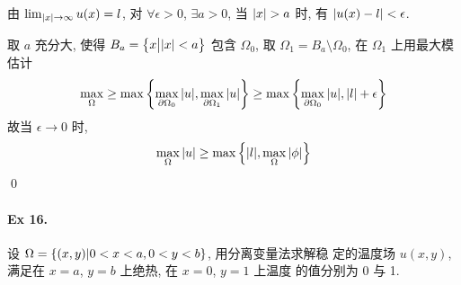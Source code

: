 \begin{solution}
由 $\lim_{{\lvert {x} \rvert} \to \infty} u(x) = l$, 对 $\forall\epsilon>0$, $\exists a>0$,
当 ${\lvert {x} \rvert}>a$ 时, 有 ${\lvert {u(x)-l} \rvert}<\epsilon$.

取 $a$ 充分大, 使得 $B_a = \big\{x \big| {\lvert {x} \rvert} < a\big\}$ 包含 $\Omega_0$, 取
$\Omega_1 = B_a \setminus \Omega_0$, 在 $\Omega_1$ 上用最大模估计
\[
\max_{\Omega} \geq \max{\left\{ {
    \max_{\partial\Omega_0}{\lvert {u} \rvert}, \max_{\partial\Omega_1}{\lvert {u} \rvert}
} \right\}} \geq \max{\left\{ {
    \max_{\partial\Omega_0}{\lvert {u} \rvert}, {\lvert {l} \rvert} + \epsilon
} \right\}}
\]
故当 $\epsilon \to 0$ 时, 
\[ \max_\Omega{\lvert {u} \rvert} \geq \max{\left\{ {{\lvert {l} \rvert},\max_\Omega{\lvert {\phi} \rvert}} \right\}} \]
\qed
\end{solution}


\paragraph{Ex 16.}
设 $\Omega = {\left\{ {(x, y) | 0 < x < a, 0 < y < b} \right\}}$, 用分离变量法求解稳
定的温度场 $u(x, y)$, 满足在 $x = a$, $y = b$ 上绝热, 在 $x = 0$, $y = 1$ 上温度
的值分别为 0 与 1.

